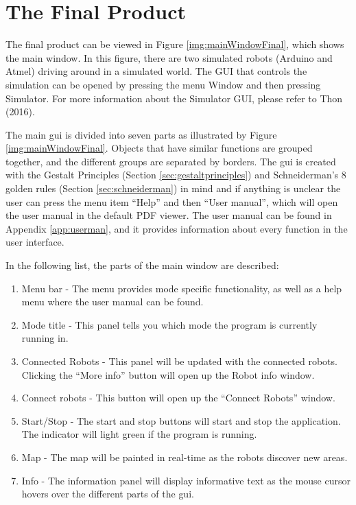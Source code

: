 \section{The Final Product}
\label{secr:finprodgui}
The final product can be viewed in Figure \ref{img:mainWindowFinal}, which shows the main window. In this figure, there are two simulated robots (Arduino and Atmel) driving around in a simulated world. The GUI that controls the simulation can be opened by pressing the menu Window and then pressing Simulator. For more information about the Simulator GUI, please refer to Thon (2016).


The main \acrshort{gui} is divided into seven parts as illustrated by Figure \ref{img:mainWindowFinal}. Objects that have similar functions are grouped together, and the different groups are separated by borders. The \acrshort{gui} is created with the Gestalt Principles (Section \ref{sec:gestaltprinciples}) and Schneiderman's 8 golden rules (Section \ref{sec:schneiderman}) in mind and if anything is unclear the user can press the menu item ``Help'' and then ``User manual'', which will open the user manual in the default PDF viewer. The user manual can be found in Appendix \ref{app:userman}, and it provides information about every function in the user interface.

In the following list, the parts of the main window are described:
\begin{enumerate}
	\item Menu bar - The menu provides mode specific functionality, as well as a help menu where the user manual can be found.
    \item Mode title - This panel tells you which mode the program is currently running in.
    \item Connected Robots - This panel will be updated with the connected robots. Clicking the ``More info'' button will open up the Robot info window.
    \item Connect robots - This button will open up the ``Connect Robots'' window.
    \item Start/Stop - The start and stop buttons will start and stop the application. The indicator will light green if the program is running.
    \item Map - The map will be painted in real-time as the robots discover new areas.
    \item Info - The information panel will display informative text as the mouse cursor hovers over the different parts of the \acrshort{gui}.
\end{enumerate}

